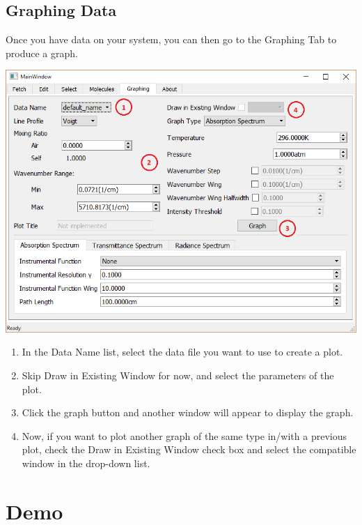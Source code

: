 \documentclass[12pt]{article}
\begin{document}
\subsection{Graphing Data}
Once you have data on your system, you can then go to the Graphing Tab to produce a graph. 
\begin{center}
\includegraphics[scale = 0.6]{MainWindow_GraphingGuide}
\end{center}
\begin{enumerate}
\item In the Data Name list, select the data file you want to use to create a plot.
\item Skip Draw in Existing Window for now, and select the parameters of the plot.
\item Click the graph button and another window will appear to display the graph.
\item Now, if you want to plot another graph of the same type in/with a previous plot, check the Draw in Existing Window check box and select the compatible window in the drop-down list.
\end{enumerate}

\section{Demo}
\end{document}
